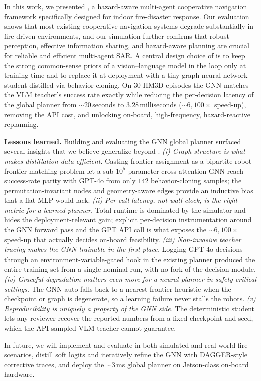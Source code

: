 In this work, we presented \system, a hazard-aware multi-agent cooperative navigation framework specifically designed for indoor fire-disaster response. Our evaluation shows that most existing cooperative navigation systems degrade substantially in fire-driven environments, and our simulation further confirms that robust perception, effective information sharing, and hazard-aware planning are crucial for reliable and efficient multi-agent SAR. A central design choice of \system is to keep the strong common-sense priors of a vision--language model in the loop only at training time and to replace it at deployment with a tiny graph neural network student distilled via behavior cloning. On 30 HM3D episodes the GNN matches the VLM teacher's success rate exactly while reducing the per-decision latency of the global planner from ${\sim}20$\,seconds to $3.28$\,milliseconds (${\sim}6{,}100\times$ speed-up), removing the API cost, and unlocking on-board, high-frequency, hazard-reactive replanning.

\textbf{Lessons learned.} Building and evaluating the GNN global planner surfaced several insights that we believe generalize beyond \system. \emph{(i) Graph structure is what makes distillation data-efficient.} Casting frontier assignment as a bipartite robot--frontier matching problem let a sub-$10^5$-parameter cross-attention GNN reach success-rate parity with GPT-4o from only $142$ behavior-cloning samples; the permutation-invariant nodes and geometry-aware edges provide an inductive bias that a flat MLP would lack. \emph{(ii) Per-call latency, not wall-clock, is the right metric for a learned planner.} Total runtime is dominated by the simulator and hides the deployment-relevant gain; explicit per-decision instrumentation around the GNN forward pass and the GPT API call is what exposes the ${\sim}6{,}100\times$ speed-up that actually decides on-board feasibility. \emph{(iii) Non-invasive teacher tracing makes the GNN trainable in the first place.} Logging GPT-4o decisions through an environment-variable-gated hook in the existing planner produced the entire training set from a single nominal run, with no fork of the decision module. \emph{(iv) Graceful degradation matters even more for a neural planner in safety-critical settings.} The GNN auto-falls-back to a nearest-frontier heuristic when the checkpoint or graph is degenerate, so a learning failure never stalls the robots. \emph{(v) Reproducibility is uniquely a property of the GNN side.} The deterministic student lets any reviewer recover the reported numbers from a fixed checkpoint and seed, which the API-sampled VLM teacher cannot guarantee.

In future, we will implement and evaluate \system in both simulated and real-world fire scenarios, distill soft logits and iteratively refine the GNN with DAGGER-style corrective traces, and deploy the ${\sim}3$\,ms global planner on Jetson-class on-board hardware.